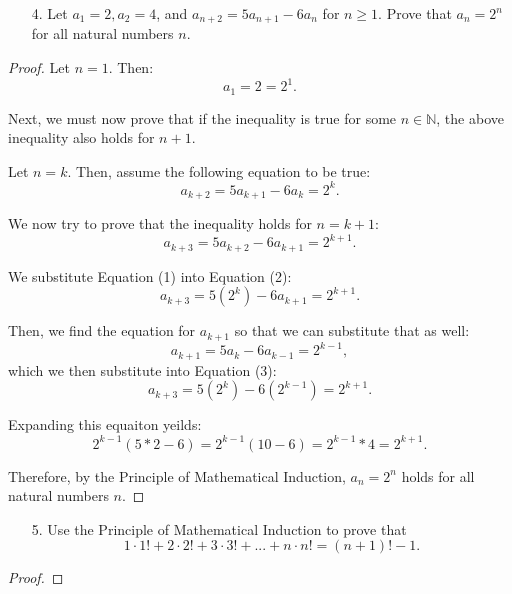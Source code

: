 \documentclass[10pt]{article}
\theoremstyle{definition}
\theoremstyle{plain}
\newcommand{\N}{\mathbb{N}}
\begin{document}
\begin{enumerate}
  \item[4.] Let $a_1 = 2, a_2 = 4$, and $a_{n+2} = 5a_{n+1} - 6a_n$ for $n \geq 1$.  Prove that $a_n = 2^n$ for all natural numbers $n$.
\end{enumerate}

\setcounter{equation}{0}
\begin{proof}
  Let $n=1$. Then:
  $$a_1 = 2 = 2^1.$$

  \par Next, we must now prove that if the inequality is true for some $n\in\N$, the above inequality also holds for $n+1$.

  \par Let $n=k$. Then, assume the following equation to be true:
  \begin{equation}
    a_{k+2} = 5a_{k+1} - 6a_k = 2^k.
  \end{equation}

  \par We now try to prove that the inequality holds for $n=k+1$:
  \begin{equation}
    a_{k+3} = 5a_{k+2} - 6a_{k+1} = 2^{k+1}.
  \end{equation}

  \par We substitute Equation (1) into Equation (2):
  \begin{equation}
    a_{k+3} = 5(2^k) - 6a_{k+1} = 2^{k+1}.
  \end{equation}

  \par Then, we find the equation for $a_{k+1}$ so that we can substitute that as well:
  \begin{equation}
    a_{k+1} = 5a_{k} - 6a_{k-1} = 2^{k-1},
  \end{equation}
  which we then substitute into Equation (3):
  \begin{equation}
    a_{k+3} = 5(2^k) - 6(2^{k-1}) = 2^{k+1}.
  \end{equation}

  \par Expanding this equaiton yeilds:
  \begin{equation}
    2^{k-1} (5*2 - 6) = 2^{k-1} (10 - 6) = 2^{k-1}*4 = 2^{k+1}.
  \end{equation}

  \par Therefore, by the Principle of Mathematical Induction, $a_n = 2^n$ holds for all natural numbers $n$.
\end{proof}



\pagebreak



\begin{enumerate}
  \item[5.] Use the Principle of Mathematical Induction to prove that
  $$1 \cdot 1! + 2 \cdot 2! + 3 \cdot 3! + ... + n \cdot n! = (n+1)! - 1.$$
\end{enumerate}

\begin{proof}
\end{proof}
\end{document}
